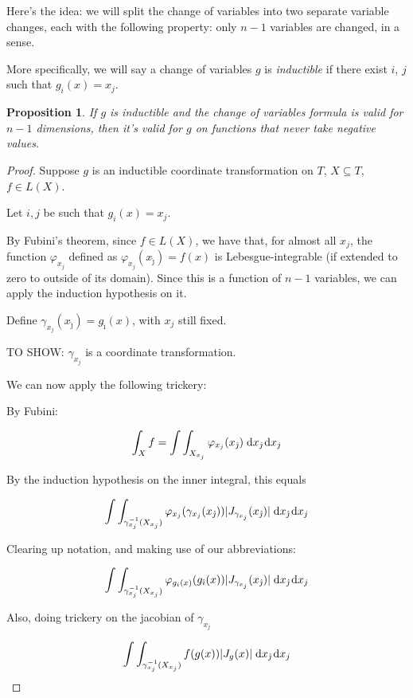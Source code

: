 \documentclass[11pt]{article}
\theoremstyle{definition}
\theoremstyle{plain}
\newtheorem{prop}{Proposition}
\newcommand{\mo}{^{-1}}
\begin{document}
Here's the idea: we will split the change of variables into two separate variable changes, each with the following property: only $n-1$ variables are changed, in a sense. %

More specifically, we will say a change of variables $g$ is \emph{inductible} if there exist $i$, $j$ such that $g_i(x) = x_j$.

\begin{prop}
If $g$ is inductible and the change of variables formula is valid for $n-1$ dimensions, then it's valid for $g$ on functions that never take negative values.
\end{prop}

\begin{proof}
Suppose $g$ is an inductible coordinate transformation on $T$, $X \subseteq T$, $f \in L(X)$.

Let $i, j$ be such that $g_i(x) = x_j$.

By Fubini's theorem, since $f \in L(X)$, we have that, for almost all $x_j$, the function $\varphi_{x_j}$ defined as $\varphi_{x_j}(x_{\hat\jmath}) = f(x)$ is Lebesgue-integrable (if extended to zero to outside of its domain). Since this is a function of $n-1$ variables, we can apply the induction hypothesis on it.

Define $\gamma_{x_j}(x_{\hat\jmath}) = g_{\hat\imath}(x)$, with $x_j$ still fixed.

TO SHOW: $\gamma_{x_j}$ is a coordinate transformation.

We can now apply the following trickery:

By Fubini:

\[\int_X f = \int \int_{X_{x_j}} \varphi_{x_j}(x_{\hat\jmath}) \d{x_{\hat\jmath}} \d{x_j}\]

By the induction hypothesis on the inner integral, this equals

\[ \int \int_{\gamma_{x_j}\mo(X_{x_j})} \varphi_{x_j}(\gamma_{x_j}(x_{\hat\jmath})) \lvert J_{\gamma_{x_j}}(x_{\hat\jmath}) \rvert \d{x_{\hat\jmath}} \d{x_j} \]

Clearing up notation, and making use of our abbreviations:

\[ \int \int_{\gamma_{x_j}\mo(X_{x_j})} \varphi_{g_i(x)}(g_{\hat\imath}(x)) \lvert J_{\gamma_{x_j}}(x_{\hat\jmath}) \rvert \d{x_{\hat\jmath}} \d{x_j} \]

Also, doing trickery on the jacobian of $\gamma_{x_j}$

\[ \int \int_{\gamma_{x_j}\mo(X_{x_j})} f(g(x)) \lvert J_g(x) \rvert \d{x_{\hat\jmath}} \d{x_j} \]


\end{proof}
\end{document}
